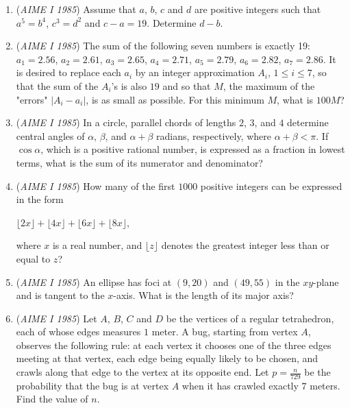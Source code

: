 \begin{enumerate}
 <a href="/wiki/index.php?title=File:AIME\_1985\_Problem\_6.png" title="File:AIME 1985 Problem 6.png">Error creating thumbnail: Unable to save thumbnail to destination</a>


	\item (\textit{AIME I 1985}) Assume that $a$, $b$, $c$ and $d$ are positive integers such that $a^5 = b^4$, $c^3 = d^2$ and $c - a = 19$. Determine $d - b$.


 

	\item (\textit{AIME I 1985}) The sum of the following seven numbers is exactly 19: $a_1 = 2.56$, $a_2 = 2.61$, $a_3 = 2.65$, $a_4 = 2.71$, $a_5 = 2.79$, $a_6 = 2.82$, $a_7 = 2.86$. It is desired to replace each $a_i$ by an integer approximation $A_i$, $1\le i \le 7$, so that the sum of the $A_i$'s is also $19$ and so that $M$, the maximum of the "errors" $\lvert A_i-a_i \rvert$, is as small as possible. For this minimum $M$, what is $100M$?


 

	\item (\textit{AIME I 1985}) In a circle, parallel chords of lengths $2$, $3$, and $4$ determine central angles of $\alpha$, $\beta$, and $\alpha + \beta$ radians, respectively, where $\alpha + \beta < \pi$. If $\cos \alpha$, which is a positive rational number, is expressed as a fraction in lowest terms, what is the sum of its numerator and denominator?


 

	\item (\textit{AIME I 1985}) How many of the first $1000$ positive integers can be expressed in the form


 $\lfloor 2x \rfloor + \lfloor 4x \rfloor + \lfloor 6x \rfloor + \lfloor 8x \rfloor$,


 where $x$ is a real number, and $\lfloor z \rfloor$ denotes the greatest integer less than or equal to $z$? 


 

	\item (\textit{AIME I 1985}) An ellipse has foci at $(9, 20)$ and $(49, 55)$ in the $xy$-plane and is tangent to the $x$-axis. What is the length of its major axis?


 

	\item (\textit{AIME I 1985}) Let $A$, $B$, $C$ and $D$ be the vertices of a regular tetrahedron, each of whose edges measures $1$ meter. A bug, starting from vertex $A$, observes the following rule: at each vertex it chooses one of the three edges meeting at that vertex, each edge being equally likely to be chosen, and crawls along that edge to the vertex at its opposite end. Let $p = \frac{n}{729}$ be the probability that the bug is at vertex $A$ when it has crawled exactly $7$ meters. Find the value of $n$.



\end{enumerate}
